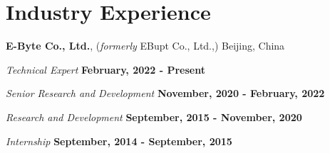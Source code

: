 \documentclass[letterpaper,11pt]{article}
\newcommand{\contentlength}{5.25in} %
\begin{document}
	
	\section{\textbf{Industry Experience}}
	\begin{tcolorbox}[flush right,breakable,colback=white,colframe=white,width=\contentlength]
		\textbf{E-Byte Co., Ltd.}, (\textit{formerly} EBupt Co., Ltd.,) Beijing, China
		
		\quad \textit{Technical Expert} \null\hfill \textbf{February, 2022 - Present}
		
		\quad \textit{Senior Research and Development} \null\hfill \textbf{November, 2020 - February, 2022}
		
		\quad \textit{Research and Development} \null\hfill \textbf{September, 2015 - November, 2020}
		
		\quad \textit{Internship} \null\hfill \textbf{September, 2014 - September, 2015}
		
	\end{tcolorbox}
	
	
\end{document}
